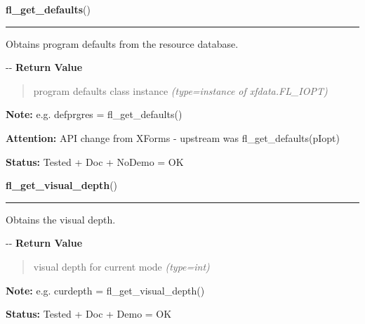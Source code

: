 \hspace{.8\funcindent}\begin{boxedminipage}{\funcwidth}

    \raggedright \textbf{fl\_get\_defaults}()

    \vspace{-1.5ex}

    \rule{\textwidth}{0.5\fboxrule}
\setlength{\parskip}{2ex}

Obtains program defaults from the resource database.

-{}-
\setlength{\parskip}{1ex}
      \textbf{Return Value}
    \vspace{-1ex}

      \begin{quote}

program defaults class instance
      {\it (type=instance of xfdata.FL\_IOPT)}

      \end{quote}

\textbf{Note:} 
e.g. defprgres = fl\_get\_defaults()


\textbf{Attention:} 
API change from XForms - upstream was
fl\_get\_defaults(pIopt)


\textbf{Status:} 
Tested + Doc + NoDemo = OK


    \end{boxedminipage}

    \label{xformslib:flxbasic:fl_get_visual_depth}

    \vspace{0.5ex}

\hspace{.8\funcindent}\begin{boxedminipage}{\funcwidth}

    \raggedright \textbf{fl\_get\_visual\_depth}()

    \vspace{-1.5ex}

    \rule{\textwidth}{0.5\fboxrule}
\setlength{\parskip}{2ex}

Obtains the visual depth.

-{}-
\setlength{\parskip}{1ex}
      \textbf{Return Value}
    \vspace{-1ex}

      \begin{quote}

visual depth for current mode
      {\it (type=int)}

      \end{quote}

\textbf{Note:} 
e.g. curdepth = fl\_get\_visual\_depth()


\textbf{Status:} 
Tested + Doc + Demo = OK


    \end{boxedminipage}

